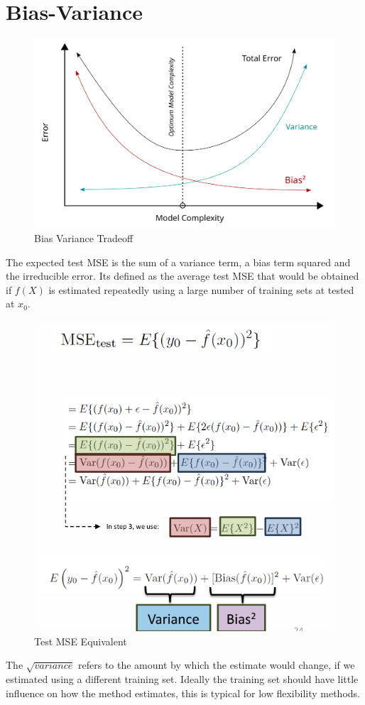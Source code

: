 \documentclass[../Main.tex]{subfiles}
\begin{document}

\newpage
\section{Bias-Variance}
\begin{figure}[H]
    \centering
    \includegraphics[width=0.75\linewidth]{Images/Bias_and_variance_contributing_to_total_error.svg.png}
    \caption{Bias Variance Tradeoff}
\end{figure}
The expected test MSE is the sum of a variance term, a bias term squared and the irreducible error.  Its defined as the average test MSE that would be obtained if \(f(X)\) is estimated repeatedly using a large number of training sets at tested at \(x_0\).
\begin{figure}[H]
    \centering
    \includegraphics[width=0.5\linewidth]{Images/bias-variance-test-mse.png}
    \caption{Test MSE Equivalent}
\end{figure}
\newpage
The \(\sqrt{variance}\) refers to the amount by which the estimate would change, if we estimated using a different training set. Ideally the training set should have little influence on how the method estimates, this is typical for low flexibility methods.
\end{document}
